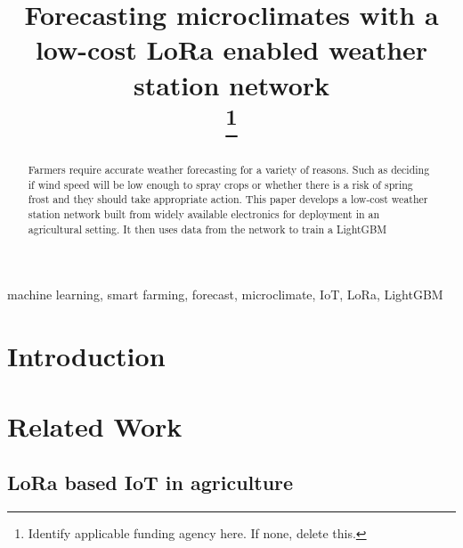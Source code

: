 \documentclass[conference]{IEEEtran}
\begin{document}
\title{Forecasting microclimates with a low-cost LoRa enabled weather station
network\\
\thanks{Identify applicable funding agency here. If none, delete this.}
}

\author{
\and
{}
 }

\maketitle

\begin{abstract}
Farmers require accurate weather forecasting for a variety of reasons. Such as
deciding if wind speed will be low enough to spray crops or whether there is a
risk of spring frost and they should take appropriate action. This paper
develops a low-cost weather station network built from widely available
electronics for deployment in an agricultural setting. It then uses data from
the network to train a LightGBM 
\end{abstract}

\begin{IEEEkeywords}
machine learning, smart farming, forecast, microclimate, IoT, LoRa, LightGBM
\end{IEEEkeywords}

\section{Introduction}\label{INTRO} 

\section{Related Work}\label{REL}

\subsection{LoRa based IoT in agriculture}
\end{document}
